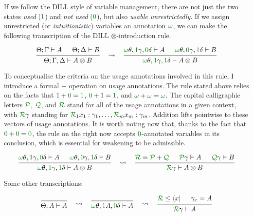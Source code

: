 If we follow the DILL style of variable management, there are not just the two
states \emph{used} ($\gr1$) and \emph{not used} ($\gr0$), but also
\emph{usable unrestrictedly}.
If we assign unrestricted (or \emph{intuitionistic}) variables an annotation
$\gr\omega$, we can make the following transcription of the DILL
$\otimes$-introduction rule.

\[
  \begin{prooftree}
    \hypo{\Theta; \Gamma \vdash A}
    \hypo{\Theta; \Delta \vdash B}
    \infer2{\Theta; \Gamma, \Delta \vdash A \otimes B}
  \end{prooftree}
  \quad\rightsquigarrow\quad
  \begin{prooftree}
    \hypo{\gr\omega\theta, \gr1\gamma, \gr0\delta \vdash A}
    \hypo{\gr\omega\theta, \gr0\gamma, \gr1\delta \vdash B}
    \infer2{\gr\omega\theta, \gr1\gamma, \gr1\delta \vdash A \otimes B}
  \end{prooftree}
\]

To conceptualise the criteria on the usage annotations involved in this rule,
I introduce a formal $+$ operation on usage annotations.
The rule stated above relies on the facts that $\gr1 + \gr0 = \gr1$,
$\gr0 + \gr1 = \gr1$, and $\gr\omega + \gr\omega = \gr\omega$.
The capital calligraphic letters $\grP$, $\grQ$, and $\grR$ stand for all of
the usage annotations in a given context, with $\grR\gamma$ standing for
$\grR_1x_1 : \gamma_1, \ldots, \grR_mx_m : \gamma_m$.
Addition lifts pointwise to these vectors of usage annotations.
It is worth noting now that, thanks to the fact that $\gr0 + \gr0 = \gr0$, the
rule on the right now accepts $\gr0$-annotated variables in its conclusion,
which is essential for weakening to be admissible.

\[
  \begin{prooftree}
    \hypo{\gr\omega\theta, \gr1\gamma, \gr0\delta \vdash A}
    \hypo{\gr\omega\theta, \gr0\gamma, \gr1\delta \vdash B}
    \infer2{\gr\omega\theta, \gr1\gamma, \gr1\delta \vdash A \otimes B}
  \end{prooftree}
  \quad\rightsquigarrow\quad
  \begin{prooftree}
    \hypo{\grR = \grP + \grQ}
    \hypo{\grP\gamma \vdash A}
    \hypo{\grQ\gamma \vdash B}
    \infer3{\grR\gamma \vdash A \otimes B}
  \end{prooftree}
\]

Some other transcriptions:

\[
  \begin{prooftree}
    \infer0{\Theta; A \vdash A}
  \end{prooftree}
  \quad\rightsquigarrow\quad
  \begin{prooftree}
    \infer0{\gr\omega\theta, \gr1A, \gr0\delta \vdash A}
  \end{prooftree}
  \quad\rightsquigarrow\quad
  \begin{prooftree}
    \hypo{\grR \leq \bra x}
    \hypo{\gamma_x = A}
    \infer2{\grR\gamma \vdash A}
  \end{prooftree}
\]

